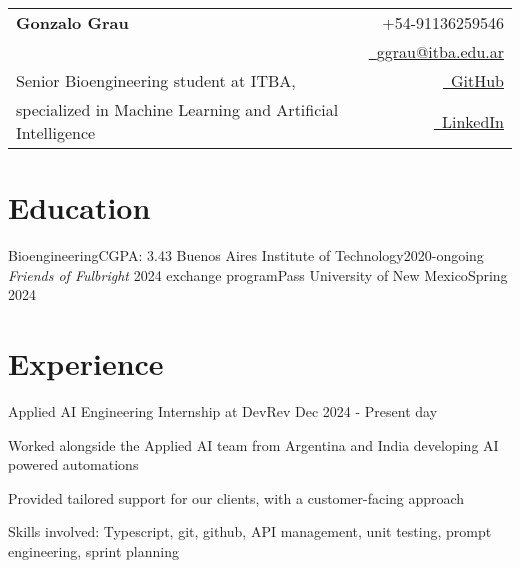 
\newcommand{\name}{Gonzalo Grau} %
\newcommand{\course}{Bioengineering} %
\newcommand{\phone}{91136259546} %
\newcommand{\emaila}{ggrau@itba.edu.ar} %


\selectfont

{
\begin{tabularx}{\linewidth}{L r} \\
  \textbf{\Huge \name} & {\raisebox{0.0\height}{\footnotesize \faPhone}\ +54-\phone}\\
  & \href{mailto:\emaila}{\raisebox{0.0\height}{\footnotesize \faEnvelope}\ {\emaila}} \\
 Senior Bioengineering student at ITBA, & \href{https://github.com/gonzagrau}{\raisebox{0.0\height}{\footnotesize \faGithub}\ {GitHub}} \\
   specialized in Machine Learning and Artificial Intelligence & \href{https://www.linkedin.com/in/gonzalo-grau/}{\raisebox{0.0\height}{\footnotesize \faLinkedin}\ {LinkedIn}}
\end{tabularx}
}


\section{\textbf{Education}}
  \resumeSubHeadingListStart
    \resumeSubheading
      {Bioengineering}{CGPA: 3.43}
      {Buenos Aires Institute of Technology}{2020-ongoing}
    \resumeSubheading
      {\textit{Friends of Fulbright} 2024 exchange program}{Pass}
      {University of New Mexico}{Spring 2024}
   \resumeSubHeadingListEnd

\vspace{-3.0mm}
\section{\textbf{Experience}}
  \resumeSubHeadingListStart
    \resumeSubheading
    {Applied AI Engineering Internship at DevRev}
    {}{}{Dec 2024 - Present day}
      \vspace{-5mm}
      \resumeItemListStart
    \item { Worked alongside the Applied AI team from Argentina and India developing AI powered automations }
    \item { Provided tailored support for our clients, with a customer-facing approach }
    \item { Skills involved: Typescript, git, github, API management, unit testing, prompt engineering, sprint planning}
    \resumeItemListEnd

